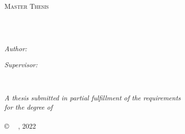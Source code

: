 \begin{titlepage}
    \begin{center}

        \vspace*{.06\textheight}
        {\scshape\LARGE \univname\par}\vspace{1.5cm} %
        \textsc{\Large Master Thesis}\\[0.5cm] %

        \HRule \\[0.4cm] %
        {\huge \bfseries \ttitle\par}\vspace{0.4cm} %
        \HRule \\[1.5cm] %

        \begin{minipage}[t]{0.4\textwidth}
            \begin{flushleft} \large
                \emph{Author:}\\
                \href{https://github.com/uduse/}{\authorname} %
            \end{flushleft}
        \end{minipage}
        \begin{minipage}[t]{0.4\textwidth}
            \begin{flushright} \large
                \emph{Supervisor:} \\
                \href{https://webdocs.cs.ualberta.ca/~mmueller/}{\supname} %
            \end{flushright}
        \end{minipage}\\[3cm]

        \vfill

        \large \textit{A thesis submitted in partial fulfillment of the requirements\\ for the degree of \degreename}\\[0.3cm] %
        \deptname\\[2cm] %


        {\large \copyright ~~ \authorname, 2022}\\[4cm] %

        \vfill
    \end{center}
\end{titlepage}